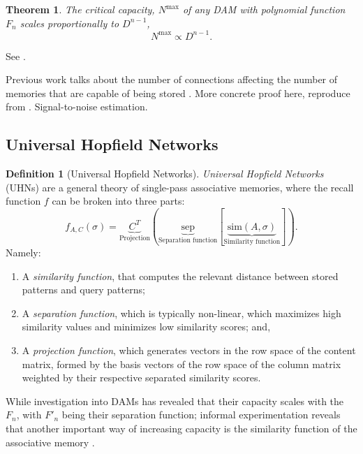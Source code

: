 \documentclass{article}
\newtheorem{theorem}{Theorem}[subsection]
\theoremstyle{definition}
\newtheorem{definition}{Definition}[subsection]
\begin{document}
\begin{theorem}
  The critical capacity, $N^\text{max}$ of any DAM with polynomial
  function $F_n$ scales proportionally to $D^{n-1}$,
  $$
  N^\text{max} \propto D^{n-1}.
  $$
\end{theorem}

See \textcites{demircigil_model_2017,krotov_dense_2016}.

Previous work talks about the number of connections affecting the number of
memories that are capable of being stored \parencite{little_analytic_1978}.
More concrete proof here, reproduce from
\parencites{krotov_dense_2016,demircigil_model_2017}.
Signal-to-noise estimation.

\subsection{Universal Hopfield Networks}\label{sec:uhn}

\begin{definition}[Universal Hopfield Networks]
  \textit{Universal Hopfield Networks} (UHNs) are a general theory
  of single-pass associative memories, where the recall function $f$
  can be broken into
  three parts:
  $$
  f_{A,C}(\sigma) = \underbrace{C^T}_{\text{Projection}} \left(
    \underbrace{\text{sep}}_{\text{Separation function}}
    \left[ \underbrace{\text{sim}(A, \sigma)}_{\text{Similarity
  function}} \right] \right).
  $$
  Namely:
  \begin{enumerate}[(1)]
    \item A \textit{similarity function}, that computes the relevant
      distance between stored
      patterns and query patterns;
    \item A \textit{separation function}, which is typically
      non-linear, which maximizes
      high similarity values and minimizes low similarity scores; and,
    \item A \textit{projection function}, which generates vectors in the row
      space of the content matrix, formed by the basis vectors of the
      row space of the
      column matrix weighted by their respective separated similarity scores.
  \end{enumerate}
\end{definition}

While investigation into DAMs has revealed that their capacity scales with
the $F_n$, with $F'_n$ being their separation function; informal experimentation
reveals that another important way of increasing capacity is the
similarity function
of the associative memory
\parencites{millidge_predictive_2022,hu_provably_2024}.
\end{document}
